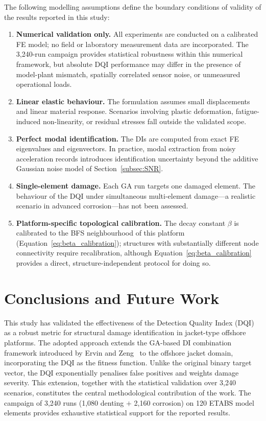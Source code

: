 \documentclass[a4paper,fleqn,nologo]{cas-dc}
\begin{document}
The following modelling assumptions define the boundary conditions of validity of the results reported in this study:

\begin{enumerate}
    \item \textbf{Numerical validation only.} All experiments are conducted on a calibrated FE model; no field or laboratory measurement data are incorporated. The 3{,}240-run campaign provides statistical robustness within this numerical framework, but absolute DQI performance may differ in the presence of model-plant mismatch, spatially correlated sensor noise, or unmeasured operational loads.
    \item \textbf{Linear elastic behaviour.} The formulation assumes small displacements and linear material response. Scenarios involving plastic deformation, fatigue-induced non-linearity, or residual stresses fall outside the validated scope.
    \item \textbf{Perfect modal identification.} The DIs are computed from exact FE eigenvalues and eigenvectors. In practice, modal extraction from noisy acceleration records introduces identification uncertainty beyond the additive Gaussian noise model of Section~\ref{subsec:SNR}.
    \item \textbf{Single-element damage.} Each GA run targets one damaged element. The behaviour of the DQI under simultaneous multi-element damage---a realistic scenario in advanced corrosion---has not been assessed.
    \item \textbf{Platform-specific topological calibration.} The decay constant $\beta$ is calibrated to the BFS neighbourhood of this platform (Equation~\ref{eq:beta_calibration}); structures with substantially different node connectivity require recalibration, although Equation~\ref{eq:beta_calibration} provides a direct, structure-independent protocol for doing so.
\end{enumerate}

\section{Conclusions and Future Work}
\label{sec:conclusiones}

This study has validated the effectiveness of the Detection Quality Index (DQI) as a robust metric for structural damage identification in jacket-type offshore platforms. The adopted approach extends the GA-based DI combination framework introduced by Ervin and Zeng~\citep{ervin2022index} to the offshore jacket domain, incorporating the DQI as the fitness function. Unlike the original binary target vector, the DQI exponentially penalises false positives and weights damage severity. This extension, together with the statistical validation over 3{,}240 scenarios, constitutes the central methodological contribution of the work. The campaign of 3{,}240 runs (1{,}080 denting $+$ 2{,}160 corrosion) on 120 ETABS model elements provides exhaustive statistical support for the reported results.
\end{document}
